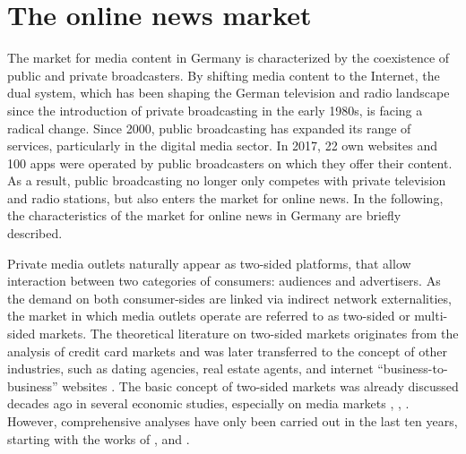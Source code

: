 \documentclass[12pt,a4paper,notitlepage]{article}
\begin{document}
\section{The online news market}\label{ch_onlinenews}

The market for media content in Germany is characterized by the coexistence of public and private broadcasters. By shifting media content to the Internet, the dual system, which has been shaping the German television and radio landscape since the introduction of private broadcasting in the early 1980s, is facing a radical change. Since 2000, public broadcasting has expanded its range of services, particularly in the digital media sector. In 2017, 22 own websites and 100 apps were operated by public broadcasters on which they offer their content. As a result, public broadcasting no longer only competes with private television and radio stations, but also enters the market for online news. In the following, the characteristics of the market for online news in Germany are briefly described. 

Private media outlets naturally appear as two-sided platforms, that allow interaction between two categories of consumers: audiences and advertisers. As the demand on both consumer-sides are linked via indirect network externalities, the market in which media outlets operate are referred to as two-sided or multi-sided markets. The theoretical literature on two-sided markets originates from the analysis of credit card markets \citep{rochet_platform_2003} and was later transferred to the concept of other industries, such as dating agencies, real estate agents, and internet “business-to-business” websites \citep{caillaud_chicken_2003}. The basic concept of two-sided markets was already discussed decades ago in several economic studies, especially on media markets \citep{corden_maximisation_1952}, \citep{gustafsson_circulation_1978}, \citep{blair_pricing_1993}. However, comprehensive analyses have only been carried out in the last ten years, starting with the works of \citet{rochet_platform_2003}, \citet{evans_empirical_2003} and \citet{armstrong_competition_2006}.
\end{document}
